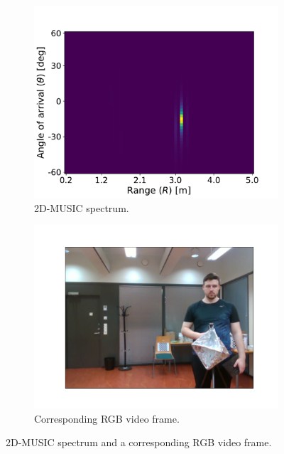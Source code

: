\begin{figure}
    \centering
    \begin{subfigure}[b]{0.49\textwidth}
        \centering
        \includegraphics[width=\textwidth]{fig/4/music_spectrum.pdf}
        \caption{2D-MUSIC spectrum.}
    \end{subfigure}
    \hfill
    \begin{subfigure}[b]{0.49\textwidth}
        \centering
        \includegraphics[width=\textwidth]{fig/4/music_corresponding_rgb_image.pdf}
        \caption{Corresponding RGB video frame.}
    \end{subfigure}
    \caption{2D-MUSIC spectrum and a corresponding RGB video frame.}
    \label{fig:2d-music-example}
\end{figure}

